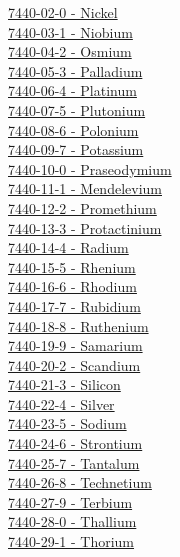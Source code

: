 \documentclass{book}
\begin{document}
\begin{multicols}{2}
\hyperref[sec:elem-nickel]{7440-02-0 - Nickel}\\
\hyperref[sec:elem-niobium]{7440-03-1 - Niobium}\\
\hyperref[sec:elem-osmium]{7440-04-2 - Osmium}\\
\hyperref[sec:elem-palladium]{7440-05-3 - Palladium}\\
\hyperref[sec:elem-platinum]{7440-06-4 - Platinum}\\
\hyperref[sec:elem-plutonium]{7440-07-5 - Plutonium}\\
\hyperref[sec:elem-polonium]{7440-08-6 - Polonium}\\
\hyperref[sec:elem-potassium]{7440-09-7 - Potassium}\\
\hyperref[sec:elem-praseodymium]{7440-10-0 - Praseodymium}\\
\hyperref[sec:elem-mendelevium]{7440-11-1 - Mendelevium}\\
\hyperref[sec:elem-promethium]{7440-12-2 - Promethium}\\
\hyperref[sec:elem-protactinium]{7440-13-3 - Protactinium}\\
\hyperref[sec:elem-radium]{7440-14-4 - Radium}\\
\hyperref[sec:elem-rhenium]{7440-15-5 - Rhenium}\\
\hyperref[sec:elem-rhodium]{7440-16-6 - Rhodium}\\
\hyperref[sec:elem-rubidium]{7440-17-7 - Rubidium}\\
\hyperref[sec:elem-ruthenium]{7440-18-8 - Ruthenium}\\
\hyperref[sec:elem-samarium]{7440-19-9 - Samarium}\\
\hyperref[sec:elem-scandium]{7440-20-2 - Scandium}\\
\hyperref[sec:elem-silicon]{7440-21-3 - Silicon}\\
\hyperref[sec:elem-silver]{7440-22-4 - Silver}\\
\hyperref[sec:elem-sodium]{7440-23-5 - Sodium}\\
\hyperref[sec:elem-strontium]{7440-24-6 - Strontium}\\
\hyperref[sec:elem-tantalum]{7440-25-7 - Tantalum}\\
\hyperref[sec:elem-technetium]{7440-26-8 - Technetium}\\
\hyperref[sec:elem-terbium]{7440-27-9 - Terbium}\\
\hyperref[sec:elem-thallium]{7440-28-0 - Thallium}\\
\hyperref[sec:elem-thorium]{7440-29-1 - Thorium}\\

\end{multicols}
\end{document}
